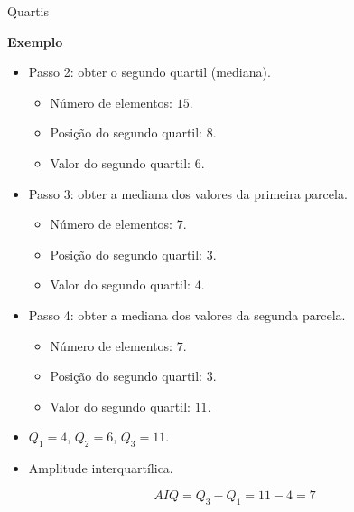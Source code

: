 \documentclass[
  ignorenonframetext,
  serif,
  professionalfont,
  usenames,
  dvipsnames,
  aspectratio = 169]{beamer}
\providecommand{\tightlist}{%
  \setlength{\itemsep}{0pt}\setlength{\parskip}{0pt}}
\renewcommand{\tightlist}{%
  \setlength{\itemsep}{0\baselineskip}
  \setlength{\parskip}{0.25\baselineskip}
}
\def\beginAHalfColumn{\begin{minipage}{0.49\textwidth}}%
\def\endColumns{\end{minipage}}%
\begin{document}
\begin{frame}{Quartis}
\protect\hypertarget{quartis-3}{}
\beginAHalfColumn

\textbf{Exemplo}

\begin{itemize}
\tightlist
\item
  Passo 2: obter o segundo quartil (mediana).

  \begin{itemize}
  \tightlist
  \item
    Número de elementos: \(15\).
  \item
    Posição do segundo quartil: \(8\).
  \item
    Valor do segundo quartil: \(6\).
  \end{itemize}
\item
  Passo 3: obter a mediana dos valores da primeira parcela.

  \begin{itemize}
  \tightlist
  \item
    Número de elementos: \(7\).
  \item
    Posição do segundo quartil: \(3\).
  \item
    Valor do segundo quartil: \(4\).
  \end{itemize}
\end{itemize}

\endColumns
\beginAHalfColumn

\begin{itemize}
\item
  Passo 4: obter a mediana dos valores da segunda parcela.

  \begin{itemize}
  \tightlist
  \item
    Número de elementos: \(7\).
  \item
    Posição do segundo quartil: \(3\).
  \item
    Valor do segundo quartil: \(11\).
  \end{itemize}
\item
  \(Q_1 = 4\), \(Q_2 = 6\), \(Q_3 = 11\).
\item
  Amplitude interquartílica.
\end{itemize}

\[AIQ = Q_3 - Q_1 = 11 - 4 = 7\]

\endColumns
\end{frame}
\end{document}
